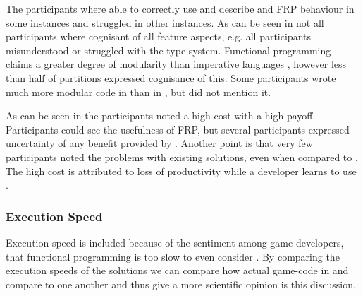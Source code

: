 The participants where able to correctly use and describe \fsh and \gls{FRP} behaviour in some instances and struggled in other instances. As can be seen in  not all participants where cognisant of all feature aspects, e.g. all participants misunderstood or struggled with the type system. Functional programming claims a greater degree of modularity than imperative languages \cite{hughes1989functional}, however less than half of partitions expressed cognisance of this. Some participants wrote much more modular code in \fsh than in \csh, but did not mention it.

As can be seen in  the participants noted a high cost with a high payoff. Participants could see the usefulness of \gls{FRP}, but several participants expressed uncertainty of any benefit provided by \fsh. Another point is that very few participants noted the problems with existing solutions, even when compared to \fsh. The high cost is attributed to loss of productivity while a developer learns to use \fsh.


\subsubsection{Execution Speed}
Execution speed is included because of the sentiment among game developers, that functional programming is too slow to even consider \cite{pop:functional:slow, pop:functional:sucks}. By comparing the execution speeds of the solutions we can compare how actual game-code in \csh and \fsh compare to one another and thus give a more scientific opinion is this discussion.
